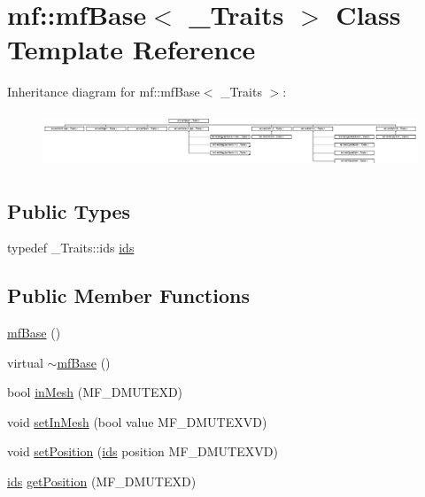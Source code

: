 \hypertarget{classmf_1_1mfBase}{
\section{mf::mfBase$<$ \_\-Traits $>$ Class Template Reference}
\label{classmf_1_1mfBase}
}
Inheritance diagram for mf::mfBase$<$ \_\-Traits $>$:\begin{figure}[H]
\begin{center}
\leavevmode
\includegraphics[height=1.630277cm]{classmf_1_1mfBase}
\end{center}
\end{figure}
\subsection*{Public Types}
\begin{DoxyCompactItemize}
\item 
typedef \_\-Traits::ids \hyperlink{classmf_1_1mfBase_a3b23f16ddf59da0a91ab12cf57c1f111}{ids}
\end{DoxyCompactItemize}
\subsection*{Public Member Functions}
\begin{DoxyCompactItemize}
\item 
\hyperlink{classmf_1_1mfBase_ad5f0db11c2b2936a128757870cf145a1}{mfBase} ()
\item 
virtual \hyperlink{classmf_1_1mfBase_a063c32e603a733ca7afdb080ffd160d3}{$\sim$mfBase} ()
\item 
bool \hyperlink{classmf_1_1mfBase_a11c27949a94ac6dc0f02a847e76fe7ed}{inMesh} (MF\_\-DMUTEXD)
\item 
void \hyperlink{classmf_1_1mfBase_aea06c4270e0a8b8509be3701f5579dd7}{setInMesh} (bool value MF\_\-DMUTEXVD)
\item 
void \hyperlink{classmf_1_1mfBase_ae092bf3cfdd2d57523418ed2f4cf1863}{setPosition} (\hyperlink{classmf_1_1mfBase_a3b23f16ddf59da0a91ab12cf57c1f111}{ids} position MF\_\-DMUTEXVD)
\item 
\hyperlink{classmf_1_1mfBase_a3b23f16ddf59da0a91ab12cf57c1f111}{ids} \hyperlink{classmf_1_1mfBase_af23d718a27ea598b23a33be5d372485e}{getPosition} (MF\_\-DMUTEXD)
\end{DoxyCompactItemize}
